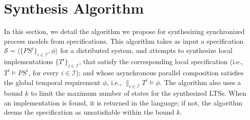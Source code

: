 \section{Synthesis Algorithm}\label{sec:algo}
In this section, we detail the algorithm we propose for synthesizing synchronized process models from specifications.
This algorithm takes as input a specification $\mathcal{S} = \langle \{ \textit{PS}^i \}_{i \in \mathcal{I}}, \phi \rangle$ for a distributed system, and attempts to synthesize  local implementations  $\{ T^i \}_{i \in \mathcal{I}}$, that satisfy the corresponding local specification (i.e., $T^i \models \mathit{PS}^i$, for every $i \in \mathcal{I}$); and whose  asynchronous parallel composition satisfies the global temporal requirement $\phi$, i.e., $\parallel_{i \in \mathcal{I}} T^i \models \phi$. The algorithm also uses a bound  $k$ to limit the maximum number of states for the synthesized LTSs.  When an implementation is found, it is returned in the {\NuSMV} language; if not, the algorithm deems the specification as unsatisfiable within the bound $k$. 

